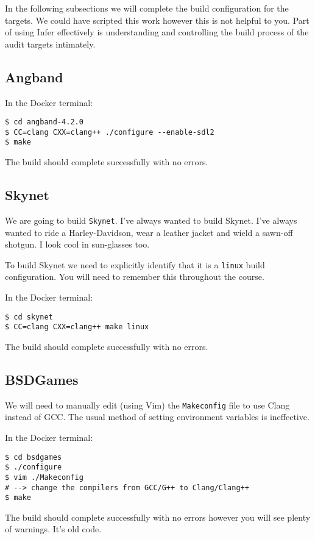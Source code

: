 In the following subsections we will complete the build configuration for the
targets.
We could have scripted this work however this is not helpful to you.
Part of using Infer effectively is understanding and controlling the build
process of the audit targets intimately.

\subsection{Angband}

In the Docker terminal:



\begin{verbatim}
$ cd angband-4.2.0
$ CC=clang CXX=clang++ ./configure --enable-sdl2
$ make
\end{verbatim}

The build should complete successfully with no errors.

\subsection{Skynet}

We are going to build \verb|Skynet|. 
I've always wanted to build Skynet.
I've always wanted to ride a Harley-Davidson, wear a leather jacket and 
wield a sawn-off shotgun. I look cool in sun-glasses too.

To build Skynet we need to explicitly identify that it is a \verb|linux| 
build configuration. You will need to remember this throughout the course.

In the Docker terminal:


\begin{verbatim}
$ cd skynet
$ CC=clang CXX=clang++ make linux
\end{verbatim}

The build should complete successfully with no errors.

\subsection{BSDGames}

We will need to manually edit (using Vim) the \verb|Makeconfig| file to use Clang instead of GCC.
The usual method of setting environment variables is ineffective.

In the Docker terminal:


\begin{verbatim}
$ cd bsdgames
$ ./configure
$ vim ./Makeconfig
# --> change the compilers from GCC/G++ to Clang/Clang++
$ make
\end{verbatim}

The build should complete successfully with no errors however you will 
see plenty of warnings. It's old code.